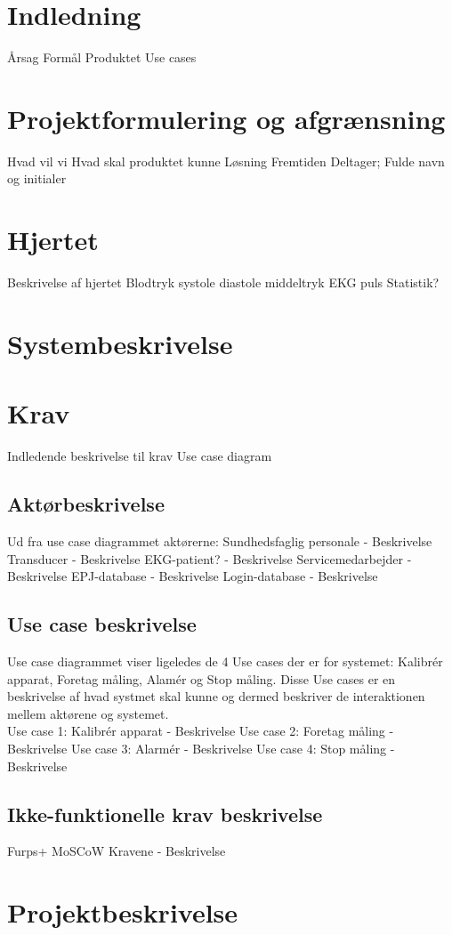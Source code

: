 \chapter{Indledning}
Årsag
Formål
Produktet
Use cases
\chapter{Projektformulering og afgrænsning}
Hvad vil vi
Hvad skal produktet kunne
Løsning
Fremtiden
Deltager; Fulde navn og initialer
\chapter{Hjertet}
Beskrivelse af hjertet
Blodtryk
systole 
diastole 
middeltryk
EKG
puls
Statistik?
\chapter{Systembeskrivelse}

\chapter{Krav}
Indledende beskrivelse til krav
Use case diagram
\section{Aktørbeskrivelse}
Ud fra use case diagrammet aktørerne:
Sundhedsfaglig personale
- Beskrivelse
Transducer
- Beskrivelse
EKG-patient?
- Beskrivelse
Servicemedarbejder
- Beskrivelse
EPJ-database
- Beskrivelse
Login-database
- Beskrivelse
\section{Use case beskrivelse}
Use case diagrammet viser ligeledes de 4 Use cases der er for systemet: Kalibrér apparat, Foretag måling, Alamér og Stop måling. Disse Use cases er en beskrivelse af hvad systmet skal kunne og dermed beskriver de interaktionen mellem aktørene og systemet.
\\
Use case 1: Kalibrér apparat
- Beskrivelse
Use case 2: Foretag måling
- Beskrivelse
Use case 3: Alarmér
- Beskrivelse
Use case 4: Stop måling
- Beskrivelse
\section{Ikke-funktionelle krav beskrivelse}
Furps+
MoSCoW
Kravene
- Beskrivelse
\chapter{Projektbeskrivelse}
